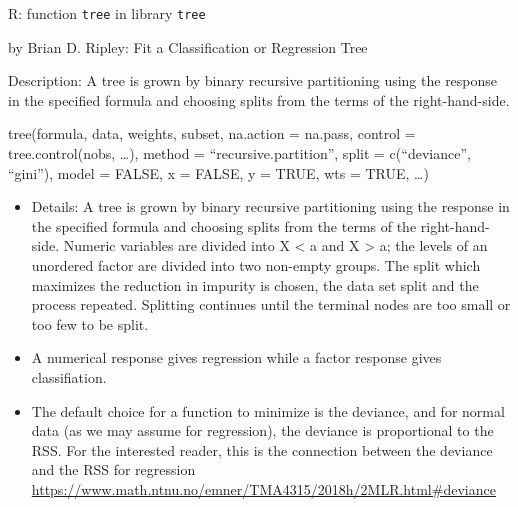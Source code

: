 \documentclass[10pt,ignorenonframetext,]{beamer}
\providecommand{\tightlist}{%
  \setlength{\itemsep}{0pt}\setlength{\parskip}{0pt}}
\begin{document}
\begin{frame}[fragile]

\begin{block}{R: function \texttt{tree} in library \texttt{tree}}

by Brian D. Ripley: Fit a Classification or Regression Tree

Description: A tree is grown by binary recursive partitioning using the
response in the specified formula and choosing splits from the terms of
the right-hand-side.

tree(formula, data, weights, subset, na.action = na.pass, control =
tree.control(nobs, \ldots{}), method = ``recursive.partition'', split =
c(``deviance'', ``gini''), model = FALSE, x = FALSE, y = TRUE, wts =
TRUE, \ldots{})

\end{block}

\end{frame}

\begin{frame}

\begin{itemize}
\tightlist
\item
  Details: A tree is grown by binary recursive partitioning using the
  response in the specified formula and choosing splits from the terms
  of the right-hand-side. Numeric variables are divided into X
  \textless{} a and X \textgreater{} a; the levels of an unordered
  factor are divided into two non-empty groups. The split which
  maximizes the reduction in impurity is chosen, the data set split and
  the process repeated. Splitting continues until the terminal nodes are
  too small or too few to be split.
\item
  A numerical response gives regression while a factor response gives
  classifiation.
\item
  The default choice for a function to minimize is the deviance, and for
  normal data (as we may assume for regression), the deviance is
  proportional to the RSS. For the interested reader, this is the
  connection between the deviance and the RSS for regression
  \url{https://www.math.ntnu.no/emner/TMA4315/2018h/2MLR.html\#deviance}
\end{itemize}

\end{frame}
\end{document}
